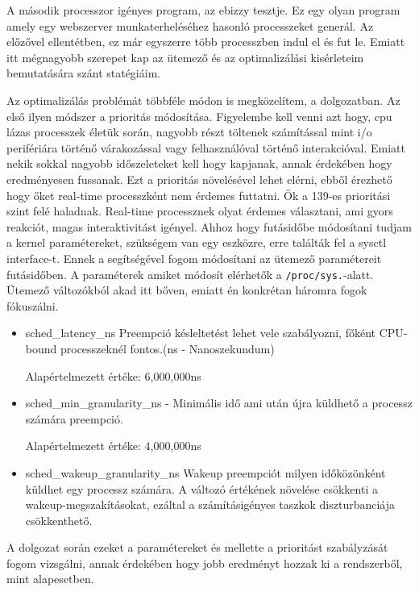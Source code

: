 A második processzor igényes program, az ebizzy tesztje. Ez egy olyan program amely egy webszerver munkaterheléséhez hasonló processzeket generál. Az előzővel ellentétben, ez már egyszerre több processzben indul el és fut le. Emiatt itt mégnagyobb szerepet kap az ütemező és az optimalizálási kisérleteim bemutatására szánt statégiáim.
 
Az optimalizálás problémát többféle módon is megközelítem, a dolgozatban.
Az első ilyen módszer a prioritás módosítása.
Figyelembe kell venni azt hogy, cpu lázas processzek életük során, nagyobb részt töltenek számítással mint i/o perifériára történő várakozással vagy felhasználóval történő interakcióval. Emiatt nekik sokkal nagyobb időszeleteket kell hogy kapjanak, annak érdekében hogy eredményesen fussanak.
Ezt a prioritás növelésével lehet elérni, ebből érezhető hogy őket real-time processzként nem érdemes futtatni. Ők a 139-es prioritási szint felé haladnak.
Real-time processznek olyat érdemes választani, ami gyors reakciót, magas interaktivitást igényel.
Ahhoz hogy futásidőbe módosítani tudjam a kernel paramétereket, szükségem van egy eszközre, erre találták fel a sysctl interface-t. Ennek a segítségével fogom módosítani az ütemező paramétereit futásidőben.
A paraméterek amiket módosít elérhetők a \texttt{/proc/sys.}-alatt. 
Ütemező változókból akad itt bőven, emiatt én konkrétan háromra fogok fókuszálni.
\begin{itemize}
	\item sched\_latency\_ns Preempció késleltetést lehet vele szabályozni, főként CPU-bound processzeknél fontos.(ns - Nanoszekundum) 
	
Alapértelmezett értéke: 6,000,000ns
	\item sched\_min\_granularity\_ns - Minimális idő ami után újra küldhető a processz számára preempció.
	
Alapértelmezett értéke: 4,000,000ns
	\item sched\_wakeup\_granularity\_ns Wakeup preempciót milyen időközönként küldhet egy processz számára. A változó értékének növelése csökkenti a wakeup-megszakításokat, ezáltal a számításigényes taszkok diszturbanciája csökkenthető.
\end{itemize}

A dolgozat során ezeket a paramétereket és mellette a prioritást szabályzását fogom vizsgálni, annak érdekében hogy jobb eredményt hozzak ki a rendszerből, mint alapesetben.


